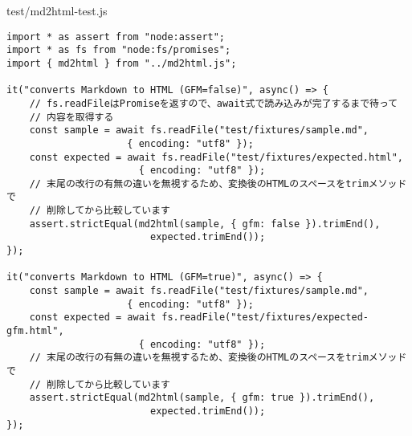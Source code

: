 \begin{listtitle}
test/md2html-test.js
\end{listtitle}
\begin{lstlisting}
import * as assert from "node:assert";
import * as fs from "node:fs/promises";
import { md2html } from "../md2html.js";

it("converts Markdown to HTML (GFM=false)", async() => {
    // fs.readFileはPromiseを返すので、await式で読み込みが完了するまで待って
    // 内容を取得する
    const sample = await fs.readFile("test/fixtures/sample.md",
                     { encoding: "utf8" });
    const expected = await fs.readFile("test/fixtures/expected.html",
                       { encoding: "utf8" });
    // 末尾の改行の有無の違いを無視するため、変換後のHTMLのスペースをtrimメソッドで
    // 削除してから比較しています
    assert.strictEqual(md2html(sample, { gfm: false }).trimEnd(),
                         expected.trimEnd());
});

it("converts Markdown to HTML (GFM=true)", async() => {
    const sample = await fs.readFile("test/fixtures/sample.md",
                     { encoding: "utf8" });
    const expected = await fs.readFile("test/fixtures/expected-gfm.html",
                       { encoding: "utf8" });
    // 末尾の改行の有無の違いを無視するため、変換後のHTMLのスペースをtrimメソッドで
    // 削除してから比較しています
    assert.strictEqual(md2html(sample, { gfm: true }).trimEnd(),
                         expected.trimEnd());
});
\end{lstlisting}
\listend
